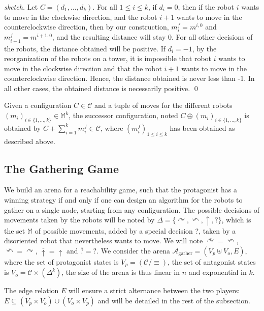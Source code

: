 \documentclass[envcountsame]{llncs} \usepackage[english]{babel}
\newcommand{\arena}{\ensuremath{\mathcal{A}}}
\newcommand{\Act}{\ensuremath{\mathbb{M}}}
\newcommand{\Config}{\ensuremath{\mathcal{C}}}
\newcommand{\Agather}{\ensuremath{\arena_{\textrm{gather}}}}
\newcommand{\Sum}[3]{\sum\limits_{#1}^{#2} #3}
\newcommand{\clockwise}{\ensuremath{\curvearrowright}}
\newcommand{\counterclockwise}{\ensuremath{\curvearrowleft}}
\newcommand{\still}{\ensuremath{\uparrow}}
\newcommand{\disoriented}{?}
\newcommand{\Actions}{\ensuremath{\Delta}}
\begin{document}
 \begin{proof}[sketch]
 Let $C=(d_1,\dots, d_k)$. For all $1\leq i\leq k$, if $d_i=0$, then if the robot $i$ wants to move in the clockwise direction, and the robot
 $i+1$ wants to move in the counterclockwise direction, then by our construction, $m^f_i=m^{i,0}$ and $m^f_{i+1}=m^{i+1,0}$, and the resulting distance will
 stay 0. For all other decisions of the robots, the distance obtained will be positive. If $d_i=-1$, by the reorganization of the robots on a tower, it is impossible
 that robot $i$ wants to move in the clockwise direction and that the robot $i+1$ wants to move in the counterclockwise direction. Hence, the distance obtained
 is never less than -1. In all other cases, the obtained distance is necessarily positive.
 \qed\end{proof} 
 
 \begin{definition}
 Given a configuration $C\in\Config$ and a tuple of moves for the different robots $(m_i)_{i\in\{1,\dots,k\}}\in \Act^k$, the successor configuration, noted
 $C\oplus (m_i)_{i\in\{1,\dots,k\}}$ is obtained by $C+\Sum{i=1}{k} m^f_i\in\Config$, where $(m^f_i)_{1\leq i\leq k}$ has been obtained as described above.
 \end{definition}
 
  
\subsection{The Gathering Game}
We build an arena for a reachability game, such that the protagonist has a winning strategy if and only if one can design an algorithm for the robots to gather on a single node, starting from any configuration. The possible decisions of movements taken by the robots will be noted by $\Actions=\{
\clockwise,\counterclockwise,\still,\disoriented\}$, which is the set $\Act$ of possible movements, added by a special decision \disoriented, taken by a disoriented robot that
nevertheless wants to move. We will note $\overline{\clockwise}=\counterclockwise$, $\overline{\counterclockwise}=\clockwise$, $\overline{\still}=\still$
and $\overline{\disoriented}=\disoriented$.
We consider the arena $\Agather=(V_p\uplus V_o,E)$, where the set of protagonist states is
$V_p= (\Config/\equiv)$,
the set of antagonist states is $V_o= \Config \times (\Actions^k)$, the size of the arena is thus linear in $n$ and exponential in $k$.

The edge relation $E$ will ensure a strict alternance between the two players: $E\subseteq (V_p\times V_o) \cup (V_o\times V_p)$ and
will be detailed in the rest of the subsection.
\medskip
\end{document}
